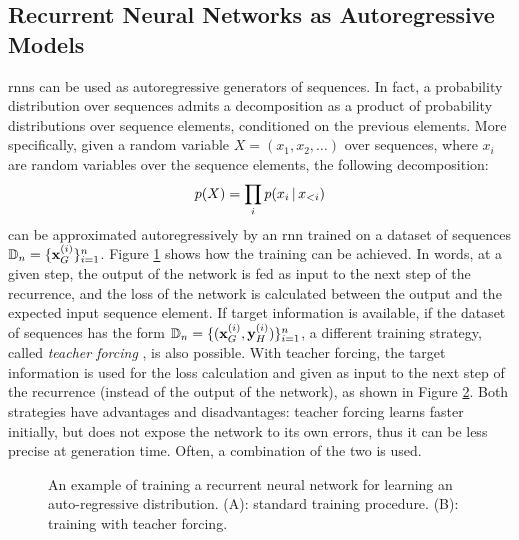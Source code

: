 \subsection{Recurrent Neural Networks as Autoregressive Models}
\glspl{rnn} can be used as autoregressive generators of sequences. In fact, a probability distribution over sequences admits a decomposition as a product of probability distributions over sequence elements, conditioned on the previous elements. More specifically, given a random variable $X = (x_1, x_2, \ldots)$ over sequences, where $x_i$ are random variables over the sequence elements, the following decomposition:
$$p(X) = \prod_i p(x_{i} \,|\, x_{<i})$$
can be approximated autoregressively by an \gls{rnn} trained on a dataset of sequences $\Data_n = \Set{\Vector{x}_G^{(i)}}_{i=1}^n$. Figure \ref{fig:auto-regressive} shows how the training can be achieved. In words, at a given step, the output of the network is fed as input to the next step of the recurrence, and the loss of the network is calculated between the output and the expected input sequence element. If target information is available, \ie if the dataset of sequences has the form $\Data_n = \Set{(\Vector{x}_G^{(i)}, \Vector{y}_H^{(i)})}_{i=1}^n$, a different training strategy, called \emph{teacher forcing} \cite{?}, is also possible. With teacher forcing, the target information is used for the loss calculation and given as input to the next step of the recurrence (instead of the output of the network), as shown in Figure \ref{fig:teacher-forcing}. Both strategies have advantages and disadvantages: teacher forcing learns faster initially, but does not expose the network to its own errors, thus it can be less precise at generation time. Often, a combination of the two is used. 
\begin{figure*}[h!]
    \begin{subfigure}[b]{0.49\linewidth}
        \centering
        \resizebox{.9\textwidth}{!}{}
        \caption{}
        \label{fig:auto-regressive}
    \end{subfigure}
    \begin{subfigure}[b]{0.49\linewidth}
        \centering
        \resizebox{.9\textwidth}{!}{}
        \caption{}
        \label{fig:teacher-forcing}
    \end{subfigure}
    \caption{An example of training a recurrent neural network for learning an auto-regressive distribution. (A): standard training procedure. (B): training with teacher forcing.}
    \label{fig:rnn-auto-regressive}
\end{figure*}
